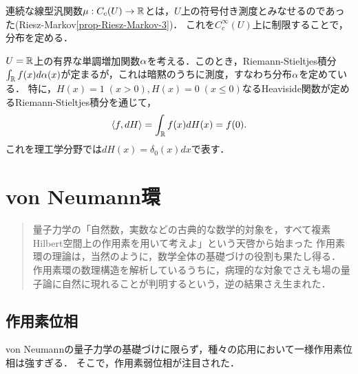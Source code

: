 \documentclass[uplatex,dvipdfmx]{jsreport}
\begin{document}
\begin{example}
    連続な線型汎関数$\mu:C_c(U)\to\mathbb{R}$とは，$U$上の符号付き測度とみなせるのであった(Riesz-Markov\ref{prop-Riesz-Markov-3})．
    これを$C_c^\infty(U)$上に制限することで，分布を定める．
\end{example}

\begin{example}[累積分布関数の消息]
    $U=\mathbb{R}$上の有界な単調増加関数$\alpha$を考える．このとき，Riemann-Stieltjes積分$\int_{\mathbb{R}} f(x)d\alpha(x)$が定まるが，これは暗黙のうちに測度，すなわち分布$\alpha$を定めている．
    特に，$H(x)=1\;(x>0),H(x)=0\;(x\le0)$なるHeaviside関数が定めるRiemann-Stieltjes積分を通じて，
    \[\langle f,dH\rangle=\int_{\mathbb{R}} f(x)dH(x)=f(0).\]
    これを理工学分野では$dH(x)=\delta_0(x)dx$で表す．
\end{example}

\chapter{von Neumann環}

\begin{quotation}
    量子力学の「自然数，実数などの古典的な数学的対象を，すべて複素Hilbert空間上の作用素を用いて考えよ」という天啓から始まった
    作用素環の理論は，当然のように，数学全体の基礎づけの役割も果たし得る．
    作用素環の数理構造を解析しているうちに，病理的な対象でさえも場の量子論に自然に現れることが判明するという，逆の結果さえ生まれた．

\end{quotation}

\section{作用素位相}

\begin{tcolorbox}[colframe=ForestGreen, colback=ForestGreen!10!white,breakable,colbacktitle=ForestGreen!40!white,coltitle=black,fonttitle=\bfseries\sffamily,
title=]
    von Neumannの量子力学の基礎づけに限らず，種々の応用において一様作用素位相は強すぎる．
    そこで，作用素弱位相が注目された．
\end{tcolorbox}
\end{document}
